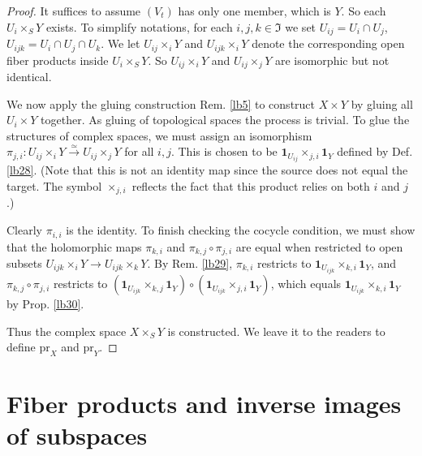 \documentclass[12pt,b5paper,notitlepage]{report}
\theoremstyle{definition}
\theoremstyle{plain}
\newcommand{\fk}{\mathfrak}
\newcommand{\id}{\mathbf{1}}
\newcommand{\pr}{\mathrm {pr}}
\numberwithin{equation}{section}
\begin{document}
\begin{proof}
It suffices to assume $(V_t)$ has only one member, which is $Y$. So each $U_i\times_S Y$ exists. To simplify notations, for each $i,j,k\in\fk I$ we set $U_{ij}=U_i\cap U_j$, $U_{ijk}=U_i\cap U_j\cap U_k$. We let $U_{ij}\times_i Y$ and $U_{ijk}\times_i Y$ denote the corresponding open fiber products inside $U_i\times_S Y$. So $U_{ij}\times_i Y$ and $U_{ij}\times_jY$ are isomorphic but not identical.

We now apply the gluing construction Rem. \ref{lb5} to construct $X\times Y$ by gluing all $U_i\times Y$ together. As gluing of topological spaces the process is trivial. To glue the structures of complex spaces, we must assign an isomorphism $\pi_{j,i}:U_{ij}\times_i Y\xrightarrow{\simeq}U_{ij}\times_jY$ for all $i,j$. This is chosen to be $\id_{U_{ij}}\times_{j,i}\id_Y$ defined by Def. \ref{lb28}. (Note that this is not an identity map since the source does not equal the target. The symbol $\times_{j,i}$ reflects the fact that this product relies on both $i$ and $j$.)

Clearly $\pi_{i,i}$ is the identity. To finish checking the cocycle condition, we must show that the holomorphic maps $\pi_{k,i}$ and  $\pi_{k,j}\circ\pi_{j,i}$ are equal  when restricted to open subsets $U_{ijk}\times_iY\rightarrow U_{ijk}\times_k Y$. By Rem. \ref{lb29}, $\pi_{k,i}$ restricts to $\id_{U_{ijk}}\times_{k,i} \id_Y$, and $\pi_{k,j}\circ\pi_{j,i}$ restricts to  $(\id_{U_{ijk}}\times_{k,j} \id_Y)\circ(\id_{U_{ijk}}\times_{j,i} \id_Y)$, which equals $\id_{U_{ijk}}\times_{k,i} \id_Y$ by Prop. \ref{lb30}. 

Thus the complex space $X\times_SY$ is constructed. We leave it to the readers to define $\pr_X$ and $\pr_Y$.
\end{proof}







\section{Fiber products and inverse images of subspaces}
\end{document}
